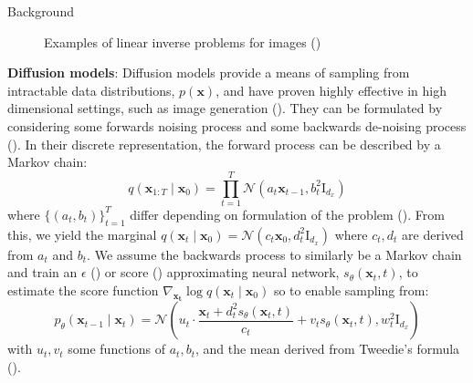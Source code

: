 \documentclass[final]{beamer}
\newlength{\colwidth}
\begin{document}
\begin{frame}[t]
\begin{columns}[t]
\begin{column}{\colwidth}
\begin{block}{Background}
\begin{figure}[htbp]
{                \label{fig:sub3}
            }
            \hfill
            \caption{Examples of linear inverse problems for images (\cite{chungDiffusionPosteriorSampling2022})}
            \label{fig:main}
        \end{figure}
    
        \textbf{Diffusion models}: Diffusion models provide a means of sampling from intractable
        data distributions, $p(\mathbf{x})$, and have proven highly effective in high dimensional
        settings, such as image generation (\cite{dhariwalDiffusionModelsBeat2021}).
        They can be formulated by considering some forwards
        noising process and some backwards de-noising process (\cite{douDiffusionPosteriorSampling2023}).
        In their discrete representation, the forward process can be described by a Markov chain:
        \begin{equation}
        q(\mathbf{x}_{1:T} \mid \mathbf{x}_0) = \prod_{t=1}^T \mathcal{N}\left(a_t \mathbf{x}_{t-1}, b_t^2\mathrm{I}_{d_x}\right) \label{eq:fwd}
        \end{equation}
        where $\{(a_t, b_t)\}_{t=1}^T$ differ depending on formulation of the problem (\cite{songScoreBasedGenerativeModeling2021}).
        From this, we yield the marginal $q(\mathbf{x}_t \mid \mathbf{x}_0) = \mathcal{N}(c_t\mathbf{x}_0, d_t^2\mathrm{I}_{d_x})$
        where $c_t, d_t$ are derived from $a_t$ and $b_t$.
        We assume the backwards process to similarly be a Markov chain
        and train an $\epsilon$ (\cite{hoDenoisingDiffusionProbabilistic2020}) or score (\cite{songScoreBasedGenerativeModeling2021}) approximating
        neural network, $s_\theta(\mathbf{x}_t, t)$, to
        estimate the score function $\nabla_{\mathbf{x_t}}\log q(\mathbf{x}_t \mid \mathbf{x}_0)$ so
        to enable sampling from:
        $$
        p_\theta(\mathbf{x}_{t-1} \mid \mathbf{x}_t) = \mathcal{N}\left(u_t\cdot \frac{\mathbf{x}_t + d_t^2 s_\theta(\mathbf{x}_t, t)}{c_t} + v_ts_\theta(\mathbf{x}_t, t), w_t^2\mathrm{I}_{d_x}\right)
        $$
        with $u_t, v_t$ some functions of $a_t, b_t$, and the mean derived from Tweedie's formula (\cite{douDiffusionPosteriorSampling2023}).


\end{block}
\end{column}
\end{columns}
\end{frame}
\end{document}
